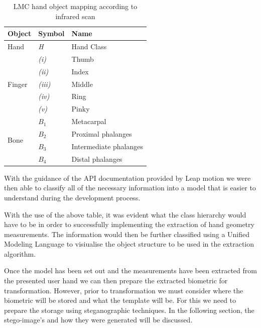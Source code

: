     \begin{table}[h!]
    \caption{LMC hand object mapping according to infrared scan}
    \centering
     \begin{tabular}{|p{} | p{}| p{}|} 
     \hline
    	\textbf{Object} & \textbf{Symbol} & \textbf{Name} \\ [1ex] 
     \hline\hline 
     Hand & \textit{H} & Hand Class  \\
     \hline 
     \multirow{5}{*}{Finger} & \textit{(i)} & Thumb \\

            & \textit{(ii)} & Index     \\
     
            & \textit{(iii)} & Middle     \\
     
            & \textit{(iv)} & Ring     \\
     
            & \textit{(v)} & Pinky      \\
    \hline        
    \multirow{4}{*}{Bone} & \(B_1\) & Metacarpal\\
     
            & \(B_2\) & Proximal phalanges     \\
     
            & \(B_3\) & Intermediate phalanges     \\
     
            & \(B_4\) & Distal phalanges     \\
     \hline
     \end{tabular}
    \end{table}
    
With the guidance of the API documentation provided by Leap motion we were then able to classify all of the necessary information into a model that is easier to understand during the development process. 

With the use of the above table, it was evident what the class hierarchy would have to be in order to successfully implementing the extraction of hand geometry measurements. The information would then be further classified using a Unified Modeling Language to visiualise the object structure to be used in the extraction algorithm.

Once the model has been set out and the measurements have been extracted from the presented user hand we can then prepare the extracted biometric for transformation. However, prior to transformation we must consider where the biometric will be stored and what the template will be. For this we need to prepare the storage using steganographic techniques. In the following section, the stego-image’s and how they were generated will be discussed.

